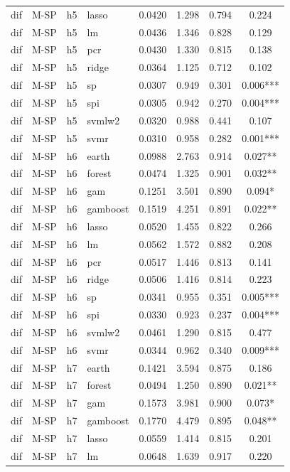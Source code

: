 \begin{ThreePartTable}
\begin{longtable}[t]{llclcccc}
dif & M-SP & h5 & lasso & 0.0420 & 1.298 & 0.794 & 0.224\\
dif & M-SP & h5 & lm & 0.0436 & 1.346 & 0.828 & 0.129\\
dif & M-SP & h5 & pcr & 0.0430 & 1.330 & 0.815 & 0.138\\
dif & M-SP & h5 & ridge & 0.0364 & 1.125 & 0.712 & 0.102\\
dif & M-SP & h5 & sp & 0.0307 & 0.949 & 0.301 & 0.006***\\
dif & M-SP & h5 & spi & 0.0305 & 0.942 & 0.270 & 0.004***\\
dif & M-SP & h5 & svmlw2 & 0.0320 & 0.988 & 0.441 & 0.107\\
dif & M-SP & h5 & svmr & 0.0310 & 0.958 & 0.282 & 0.001***\\
\addlinespace
dif & M-SP & h6 & earth & 0.0988 & 2.763 & 0.914 & 0.027**\\
dif & M-SP & h6 & forest & 0.0474 & 1.325 & 0.901 & 0.032**\\
dif & M-SP & h6 & gam & 0.1251 & 3.501 & 0.890 & 0.094*\\
dif & M-SP & h6 & gamboost & 0.1519 & 4.251 & 0.891 & 0.022**\\
dif & M-SP & h6 & lasso & 0.0520 & 1.455 & 0.822 & 0.266\\
dif & M-SP & h6 & lm & 0.0562 & 1.572 & 0.882 & 0.208\\
dif & M-SP & h6 & pcr & 0.0517 & 1.446 & 0.813 & 0.141\\
dif & M-SP & h6 & ridge & 0.0506 & 1.416 & 0.814 & 0.223\\
dif & M-SP & h6 & sp & 0.0341 & 0.955 & 0.351 & 0.005***\\
dif & M-SP & h6 & spi & 0.0330 & 0.923 & 0.237 & 0.004***\\
dif & M-SP & h6 & svmlw2 & 0.0461 & 1.290 & 0.815 & 0.477\\
dif & M-SP & h6 & svmr & 0.0344 & 0.962 & 0.340 & 0.009***\\
\addlinespace
dif & M-SP & h7 & earth & 0.1421 & 3.594 & 0.875 & 0.186\\
dif & M-SP & h7 & forest & 0.0494 & 1.250 & 0.890 & 0.021**\\
dif & M-SP & h7 & gam & 0.1573 & 3.981 & 0.900 & 0.073*\\
dif & M-SP & h7 & gamboost & 0.1770 & 4.479 & 0.895 & 0.048**\\
dif & M-SP & h7 & lasso & 0.0559 & 1.414 & 0.815 & 0.201\\
dif & M-SP & h7 & lm & 0.0648 & 1.639 & 0.917 & 0.220\\

\end{longtable}
\end{ThreePartTable}
